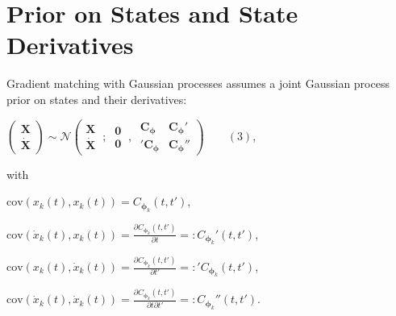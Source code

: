 \section{Prior on States and State Derivatives}

\begin{par}
Gradient matching with Gaussian processes assumes a joint Gaussian process prior on states and their derivatives:
\end{par} \vspace{1em}
\begin{par}
$\left(\begin{array}{c} \mathbf{X} \\ \dot{\mathbf{X}} \end{array}\right) \sim \mathcal{N} \left(\begin{array}{c} \mathbf{X} \\ \dot{\mathbf{X}} \end{array}~;~\begin{array}{c} \mathbf{0} \\\mathbf{0} \end{array}~,~\begin{array}{cc} \mathbf{C}_{\boldsymbol\phi} & \mathbf{C}_{\boldsymbol\phi}' \\ '\mathbf{C}_{\boldsymbol\phi} & \mathbf{C}_{\boldsymbol\phi}'' \end{array} \right) \qquad (3)$,
\end{par} \vspace{1em}
\begin{par}
with
\end{par} \vspace{1em}
\begin{par}
$\mathrm{cov}(x_k(t), x_k(t)) = C_{\boldsymbol\phi_k}(t,t')$,
\end{par} \vspace{1em}
\begin{par}
$\mathrm{cov}(\dot{x}_k(t), x_k(t)) = \frac{\partial C_{\boldsymbol\phi_k}(t,t')}{\partial t} =: C_{{\boldsymbol\phi}_k}'(t,t')$,
\end{par} \vspace{1em}
\begin{par}
$\mathrm{cov}(x_k(t), \dot{x}_k(t)) = \frac{\partial C_{\boldsymbol\phi_k}(t,t')}{\partial t'} =: {'C_{\boldsymbol\phi_k}(t,t')}$,
\end{par} \vspace{1em}
\begin{par}
$\mathrm{cov}(\dot{x}_k(t), \dot{x}_k(t)) = \frac{\partial C_{\boldsymbol\phi_k}(t,t') }{\partial t \partial t'} =: C_{\boldsymbol\phi_k}''(t,t')$.
\end{par} \vspace{1em}


